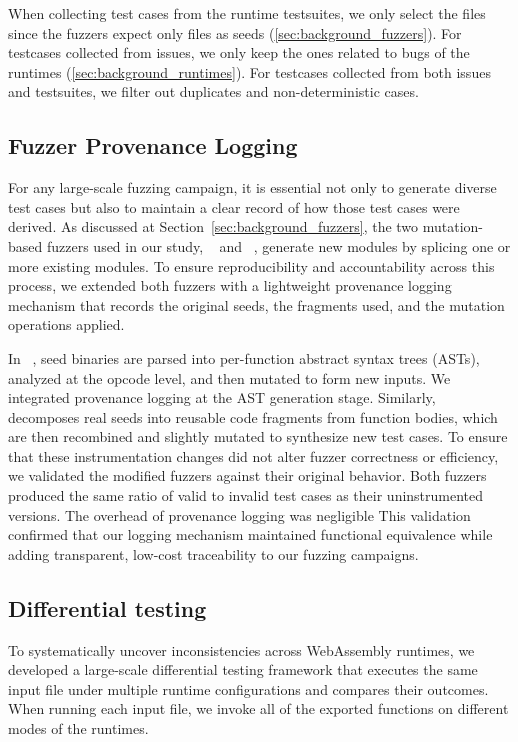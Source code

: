 \documentclass[lettersize,journal]{IEEEtran}
\begin{document}
When collecting test cases from the runtime testsuites, we only select the  files since the fuzzers expect only  files as seeds (\textsection{}\ref{sec:background_fuzzers}). For testcases collected from issues, we only keep the ones related to  bugs of the runtimes (\textsection{}\ref{sec:background_runtimes}). For testcases collected from both issues and testsuites, we filter out duplicates and non-deterministic cases.


\subsection{Fuzzer Provenance Logging}
\label{sec:provenance_logging}

For any large-scale fuzzing campaign, it is essential not only to generate diverse test cases but also to maintain a clear record of how those test cases were derived. As discussed at Section~\ref{sec:background_fuzzers}, the two mutation-based fuzzers used in our study, \wapplique{}~\cite{zhao2024wapplique} and \wasmaker{}~\cite{cao2024wasmaker}, generate new \wasm{} modules by splicing one or more existing \wasm{} modules. To ensure reproducibility and accountability across this process, we extended both fuzzers with a lightweight provenance logging mechanism that records the original seeds, the fragments used, and the mutation operations applied.

In \wasmaker{}~\cite{cao2024wasmaker}, seed \wasm{} binaries are parsed into per-function abstract syntax trees (ASTs), analyzed at the opcode level, and then mutated to form new inputs. We integrated provenance logging at the AST generation stage.
Similarly, \wapplique{}~\cite{zhao2024wapplique} decomposes real \wasm{} seeds into reusable code fragments from function bodies, which are then recombined and slightly mutated to synthesize new test cases. 
To ensure that these instrumentation changes did not alter fuzzer correctness or efficiency, we validated the modified fuzzers against their original behavior. Both fuzzers produced the same ratio of valid to invalid test cases as their uninstrumented versions. The overhead of provenance logging was negligible 
This validation confirmed that our logging mechanism maintained functional equivalence while adding transparent, low-cost traceability to our fuzzing campaigns.



\subsection{Differential testing}
\label{sec:diff_testing}
To systematically uncover inconsistencies across WebAssembly runtimes, we developed a large-scale differential testing framework that executes the same input \wasm{} file under multiple runtime configurations and compares their outcomes. When running each input \wasm{} file, we invoke all of the exported functions on different modes of the runtimes.
\end{document}
